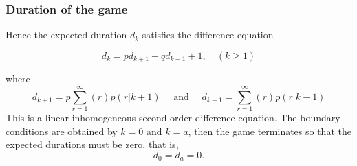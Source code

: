 \documentclass[spanish]{beamer}
\begin{document}
\begin{frame}
\frametitle{Duration of the game}
Hence the expected duration $d_{k}$ satisfies the difference equation

\begin{equation*}
d_{k} = p d_{k+1} + q d_{k-1} + 1, \quad (k \geq 1)
\end{equation*}

where
\begin{equation*}
d_{k+1} = p \sum_{r=1}^{\infty} (r)p(r \vert k+1) \quad \text{  and  } \quad d_{k-1}=\sum_{r=1}^{\infty}(r)p(r\vert k -1)
\end{equation*}
This is a linear inhomogeneous second-order difference equation. The boundary conditions are obtained by $k = 0$ and $k = a$, then the game terminates so that the expected durations must be zero, that is, 
\begin{equation*}
d_{0} = d_{a} = 0.
\end{equation*}


\end{frame}


\end{document}
